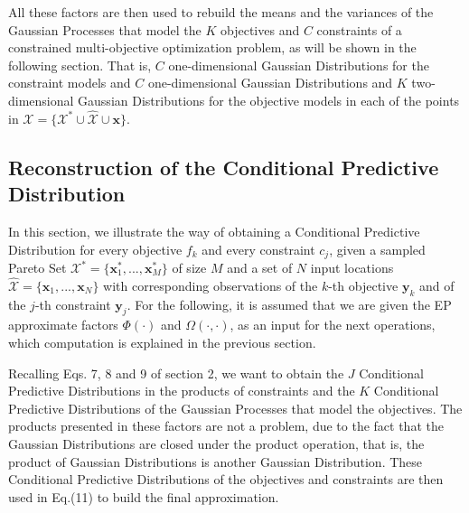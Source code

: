 All these factors are then used to rebuild the means and the variances of the Gaussian Processes that model the $K$ objectives and $C$ constraints of a constrained multi-objective optimization problem, as will be shown in the following section. That is, $C$ one-dimensional Gaussian Distributions for the constraint models and $C$ one-dimensional Gaussian Distributions and $K$ two-dimensional Gaussian Distributions for the objective models in each of the points in $\mathcal{X} = \{\mathcal{X}^* \cup \hat{\mathcal{X}} \cup \boldsymbol{x}\}$.

\subsection{Reconstruction of the Conditional Predictive Distribution}
In this section, we illustrate the way of obtaining a Conditional Predictive Distribution for every objective $f_k$ and every constraint $c_j$, given a sampled Pareto Set $\mathcal{X}^* = \{\boldsymbol{x}_1^*,...,\boldsymbol{x}_M^*\}$ of size $M$ and a set of $N$ input locations $\hat{\mathcal{X}} = \{\boldsymbol{x}_1,...,\boldsymbol{x}_N\}$ with corresponding observations of the $k$-th objective $\boldsymbol{y}_k$ and of the $j$-th constraint $\boldsymbol{y}_j$. For the following, it is assumed that we are given the EP approximate factors $\Phi(\cdot)$ and $\Omega(\cdot,\cdot)$, as an input for the next operations, which computation is explained in the previous section.

Recalling Eqs. 7, 8 and 9 of section 2, we want to obtain the $J$ Conditional Predictive Distributions in the products of constraints and the $K$ Conditional Predictive Distributions of the Gaussian Processes that model the objectives. The products presented in these factors are not a problem, due to the fact that the Gaussian Distributions are closed under the product operation, that is, the product of Gaussian Distributions is another Gaussian Distribution. These Conditional Predictive Distributions of the objectives and constraints are then used in Eq.(11) to build the final approximation.

